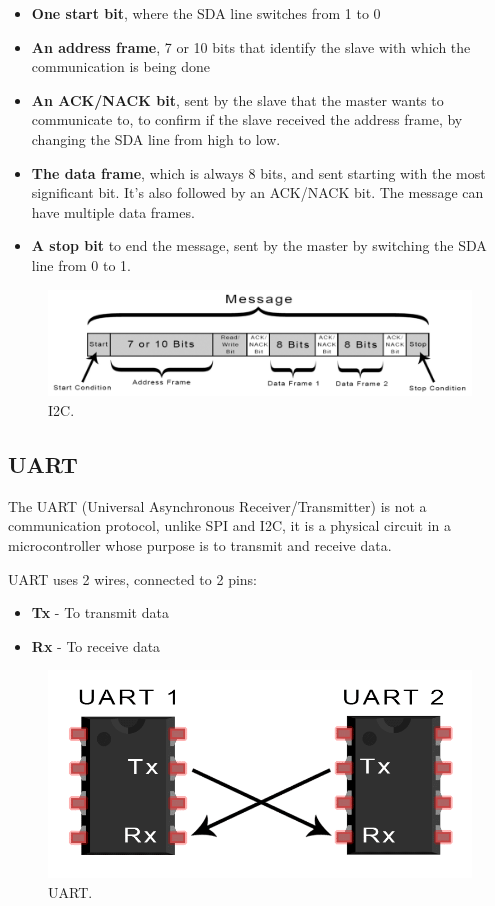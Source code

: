 \documentclass[english]{ist-thesis}
\begin{document}
\begin{itemize}
  \item \textbf{One start bit}, where the SDA line switches from 1 to 0
  \item \textbf{An address frame}, 7 or 10 bits that identify the slave with which the communication is being done
  \item \textbf{An ACK/NACK bit}, sent by the slave that the master wants to communicate to, to confirm if the slave received the address frame, by changing the SDA line from high to low.
  \item \textbf{The data frame}, which is always 8 bits, and sent starting with the most significant bit. It's also followed by an ACK/NACK bit. The message can have multiple data frames.
  \item \textbf{A stop bit} to end the message, sent by the master by switching the SDA line from 0 to 1.
\end{itemize}

\begin{figure}[ht]
	\centering
	\includegraphics[width = 0.8\linewidth]{images/protocolos/i2c_message.png}
	\caption{I2C.}
	\label{fig:i2c}
\end{figure}

\subsection{UART}

The UART (Universal Asynchronous Receiver/Transmitter) is not a communication protocol, unlike SPI and I2C, it is a physical circuit in a microcontroller whose purpose is to transmit and receive data. 

UART uses 2 wires, connected to 2 pins:

\begin{itemize}
    \item \textbf{Tx} - To transmit data
    \item \textbf{Rx} - To receive data
\end{itemize}

\begin{figure}[ht]
	\centering
	\includegraphics[width = 0.8\linewidth]{images/protocolos/uart.png}
	\caption{UART.}
	\label{fig:uart}
\end{figure}
\end{document}

